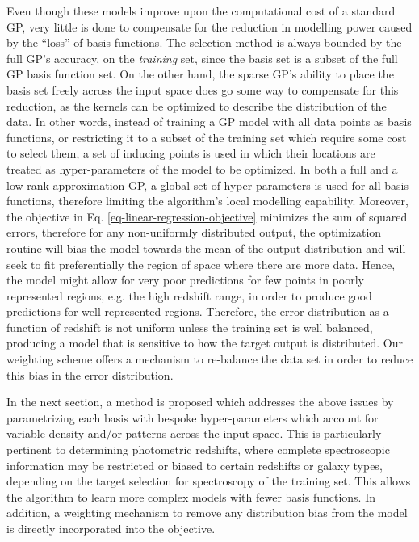 \documentclass[useAMS,usenatbib,fleqn]{mn2e}
\begin{document}
Even though these models improve upon the computational cost of a standard GP, very little is done to compensate for the reduction in modelling power caused by the ``loss'' of basis functions. The selection method is always bounded by the full GP's accuracy, on the \emph{training} set, since the basis set is a subset of the full GP basis function set. On the other hand, the sparse GP's ability to place the basis set freely across the input space does go some way to compensate for this reduction, as the kernels can be optimized to describe the distribution of the data. In other words, instead of training a GP model with all data points as basis functions, or restricting it to a subset of the training set which require some cost to select them, a set of inducing points is used in which their locations are treated as hyper-parameters of the model to be optimized. In both a full and a low rank approximation GP, a global set of hyper-parameters is used for all basis functions, therefore limiting the algorithm's local modelling capability. Moreover, the objective in Eq. \eqref{eq-linear-regression-objective} minimizes the sum of squared errors, therefore for any non-uniformly distributed output, the optimization routine will bias the model towards the mean of the output distribution and will seek to fit preferentially the region of space where there are more data. Hence, the model might allow for very poor predictions for few points in poorly represented regions, e.g. the high redshift range, in order to produce good predictions for well represented regions. Therefore, the error distribution as a function of redshift is not uniform unless the training set is well balanced, producing a model that is sensitive to how the target output is distributed. Our weighting scheme offers a mechanism to re-balance the data set in order to reduce this bias in the error distribution.

In the next section, a method is proposed which addresses the above issues by parametrizing each basis with bespoke hyper-parameters which account for variable density and/or patterns across the input space. This is particularly pertinent to determining photometric redshifts, where complete spectroscopic information may be restricted or biased to certain redshifts or galaxy types, depending on the target selection for spectroscopy of the training set.
This allows the algorithm to learn more complex models with fewer basis functions. In addition, a weighting mechanism to remove any distribution bias from the model is directly incorporated into the objective.
\end{document}
